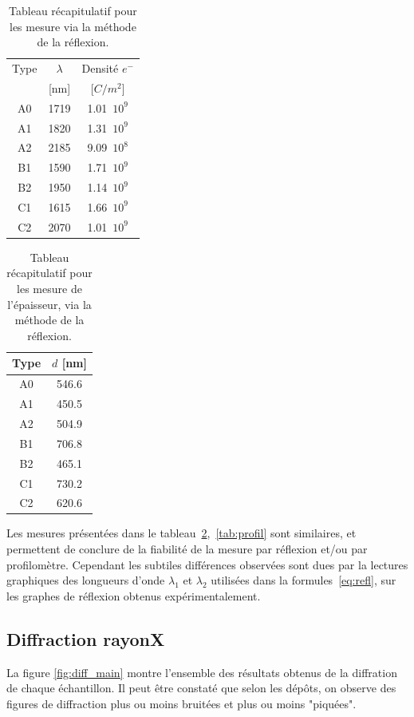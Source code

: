 \documentclass[a4paper,12pt,oneside]{article}
\begin{document}
\begin{table}[ht]
   \centering
   \begin{tabular}{|c|c|c|}
	  \hline
      Type & $\lambda$ & Densité $e^{-}$\\
      & [nm] & [$C/m^2$]\\
      \hline
      A0 & 1719 & 1.01\ $10^{9}$\\
      A1 & 1820 & 1.31\ $10^{9}$\\
      A2 & 2185 & 9.09\ $10^{8}$\\
      B1 & 1590 & 1.71\ $10^{9}$\\
      B2 & 1950 & 1.14\ $10^{9}$\\
      C1 & 1615 & 1.66\ $10^{9}$\\
      C2 & 2070 & 1.01\ $10^{9}$\\
      \hline
   \end{tabular}
   \caption{Tableau récapitulatif pour les mesure via la méthode de la réflexion.}\label{tab:reflexion}
\end{table}

\begin{table}[ht]
   \centering
   \begin{tabular}{|c|c|}
	  \hline
      Type & $d$ [nm]\\
      \hline
      A0 & 546.6 \\
      A1 & 450.5 \\
      A2 & 504.9 \\
      B1 & 706.8 \\
      B2 & 465.1 \\
      C1 & 730.2 \\
      C2 & 620.6 \\
      \hline
   \end{tabular}
   \caption{Tableau récapitulatif pour les mesure de l'épaisseur, via la méthode de la réflexion.}\label{tab:epaisseur}
\end{table}

Les mesures présentées dans le tableau~\ref{tab:epaisseur},~\ref{tab:profil} sont similaires, et permettent de conclure de la fiabilité de la mesure par réflexion et/ou par profilomètre. Cependant les subtiles différences observées sont dues par la lectures graphiques des longueurs d'onde $\lambda_1$ et $\lambda_2$ utilisées dans la formules~\ref{eq:refl}, sur les graphes de réflexion obtenus expérimentalement.

\subsection{Diffraction rayonX}
La figure \ref{fig:diff_main} montre l'ensemble des résultats obtenus de la diffration de chaque échantillon. Il peut être constaté que selon les dépôts, on observe des figures de diffraction plus ou moins bruitées et plus ou moins "piquées".
\end{document}
